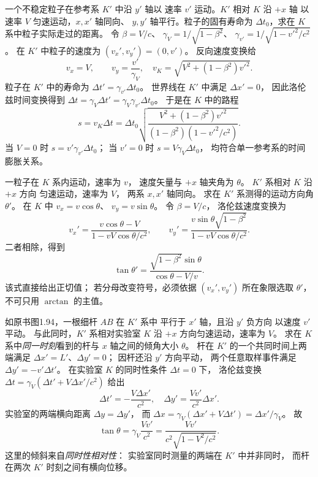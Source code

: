 一个不稳定粒子在参考系 $K'$ 中沿 $y'$ 轴以
速率 $v'$ 运动。$K'$ 相对 $K$ 沿 $+x$ 轴
以速率 $V$ 匀速运动，$x,x'$ 轴同向、
$y,y'$ 轴平行。粒子的固有寿命为
$\Delta t_0$，求在 $K$ 系中粒子实际走过的距离。
\exsolution
令 $\beta=V/c$、
$\gamma_V=1/\sqrt{1-\beta^2}$、
$\gamma_{v'}=1/\sqrt{1-v'^2/c^2}$。
在 $K'$ 中粒子的速度为
$(v_x',v_y')=(0,v')$。
反向速度变换给
\[
v_x=V,\qquad v_y=\frac{v'}{\gamma_V},
\quad
v_K=\sqrt{V^2+(1-\beta^2)v'^2}.
\]
粒子在 $K'$ 中的寿命为
$\Delta t'=\gamma_{v'}\Delta t_0$。
世界线在 $K'$ 中满足 $\Delta x'=0$，
因此洛伦兹时间变换得到
$\Delta t=\gamma_V\Delta t'=
\gamma_V\gamma_{v'}\Delta t_0$。
于是在 $K$ 中的路程
\[
\boxed{s=v_K\Delta t=
\Delta t_0\sqrt{
\frac{V^2+(1-\beta^2)v'^2}
{(1-\beta^2)(1-v'^2/c^2)}}}.
\]
\excheck 当 $V=0$ 时
$s=v'\gamma_{v'}\Delta t_0$；
当 $v'=0$ 时
$s=V\gamma_V\Delta t_0$，
均符合单一参考系的时间膨胀关系。

一粒子在 $K$ 系内运动，速率为 $v$，
速度矢量与 $+x$ 轴夹角为 $\theta$。
$K'$ 系相对 $K$ 沿 $+x$ 方向
匀速运动，速率为 $V$，
两系 $x,x'$ 轴同向。
求在 $K'$ 系测得的运动方向角 $\theta'$。
\exsolution
在 $K$ 中
$v_x=v\cos\theta$、
$v_y=v\sin\theta$。
令 $\beta=V/c$，
洛伦兹速度变换为
\[
v_x'=\frac{v\cos\theta-V}
{1-vV\cos\theta/c^2},\qquad
v_y'=\frac{v\sin\theta\sqrt{1-\beta^2}}
{1-vV\cos\theta/c^2}.
\]
二者相除，得到
\[
\boxed{\tan\theta'=
\frac{\sqrt{1-\beta^2}\sin\theta}
{\cos\theta-V/v}}.
\]
\excheck 该式直接给出正切值；
若分母改变符号，必须依据
$(v_x',v_y')$ 所在象限选取
$\theta'$，不可只用 $\arctan$ 的主值。

如原书图1.94，一根细杆 $AB$ 在 $K'$ 系中
平行于 $x'$ 轴，且沿 $y'$ 负方向
以速度 $v'$ 平动。
与此同时，$K'$ 系相对实验室 $K$
沿 $+x$ 方向匀速运动，速率为 $V$。
求在 $K$ 系中\emph{同一时刻}看到的杆与
$x$ 轴之间的倾角大小 $\theta$。
\exsolution
杆在 $K'$ 的一个共同时间上两端满足
$\Delta x'=L'$、$\Delta y'=0$；
因杆还沿 $y'$ 方向平动，
两个任意取样事件满足
$\Delta y'=-v'\Delta t'$。
在实验室 $K$ 的同时性条件 $\Delta t=0$ 下，
洛伦兹变换
$\Delta t=\gamma_V(\Delta t'+V\Delta x'/c^2)$
给出
\[
\Delta t'=-\frac{V\Delta x'}{c^2},
\quad
\Delta y'=\frac{Vv'}{c^2}\Delta x'.
\]
实验室的两端横向距离
$\Delta y=\Delta y'$，
而
$\Delta x=\gamma_V(\Delta x'+V\Delta t')
=\Delta x'/\gamma_V$。
故
\[
\boxed{\tan\theta=
\gamma_V\frac{Vv'}{c^2}
=\frac{Vv'}{c^2\sqrt{1-V^2/c^2}}}.
\]
\excheck 这里的倾斜来自\emph{同时性相对性}：
实验室同时测量的两端在 $K'$ 中并非同时，
而杆在两次 $K'$ 时刻之间有横向位移。

